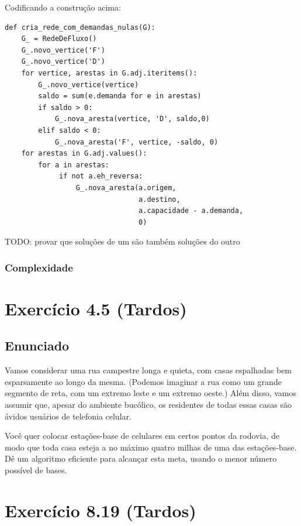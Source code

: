 \documentclass[11pt]{article}
\begin{document}
\begin{enumerate}
Codificando a construção acima:
\begin{verbatim}
def cria_rede_com_demandas_nulas(G):
    G_ = RedeDeFluxo()
    G_.novo_vertice('F')
    G_.novo_vertice('D')
    for vertice, arestas in G.adj.iteritems():
        G_.novo_vertice(vertice)
        saldo = sum(e.demanda for e in arestas)
        if saldo > 0:
            G_.nova_aresta(vertice, 'D', saldo,0)
        elif saldo < 0:
            G_.nova_aresta('F', vertice, -saldo, 0)
    for arestas in G.adj.values():
        for a in arestas:
             if not a.eh_reversa:
                 G_.nova_aresta(a.origem,
                                a.destino,
                                a.capacidade - a.demanda,
                                0)
\end{verbatim}
TODO: provar que soluções de um são também soluções do outro
\end{enumerate}


\subsubsection{Complexidade}
\label{sec-3-3-4}

\section{Exercício 4.5 (Tardos)}
\label{sec-4}

\subsection{Enunciado}
\label{sec-4-1}

Vamos considerar uma rua campestre longa e quieta, com casas
espalhadas bem esparsamente ao longo da mesma. (Podemos imaginar a
rua como um grande segmento de reta, com um extremo leste e um
extremo oeste.) Além disso, vamos assumir que, apesar do ambiente
bucólico, os residentes de todas essas casas são ávidos usuários de
telefonia celular.

Você quer colocar estações-base de celulares em certos pontos da
rodovia, de modo que toda casa esteja a no máximo quatro milhas de
uma das estações-base. Dê um algoritmo eficiente para alcançar esta
meta, usando o menor número possível de bases.


\section{Exercício 8.19 (Tardos)}
\label{sec-5}
\end{document}
